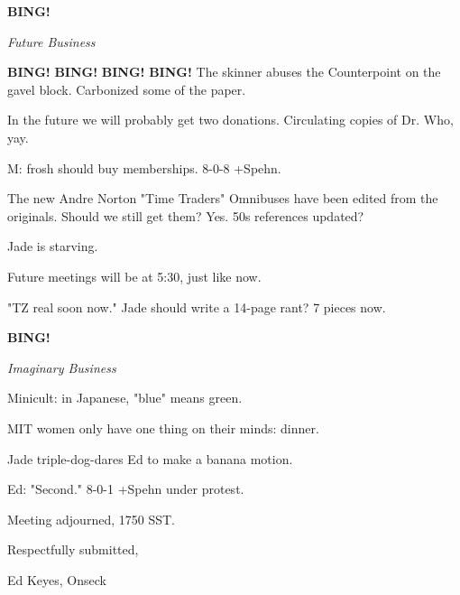 \documentclass[12pt]{article}
\newcommand{\bing}{{\bf BING!} }
\newcommand{\goto}[1]{\bing \vskip 12pt \centerline{{\em{#1}}}}
\begin{document}
\goto{Future Business}

\bing \bing \bing \bing The skinner abuses the Counterpoint on the gavel block. Carbonized some of the paper.

In the future we will probably get two donations. Circulating copies of Dr. Who, yay.

M: frosh should buy memberships. 8-0-8 +Spehn.

The new Andre Norton "Time Traders" Omnibuses have been edited from the originals. Should we still get them? Yes. 50s references updated?

Jade is starving.

Future meetings will be at 5:30, just like now.

"TZ real soon now." Jade should write a 14-page rant? 7 pieces now.

\goto{Imaginary Business}

Minicult: in Japanese, "blue" means green.

MIT women only have one thing on their minds: dinner.

Jade triple-dog-dares Ed to make a banana motion.

Ed: "Second." 8-0-1 +Spehn under protest.

\vspace{12pt}

\noindent
Meeting adjourned, 1750 SST.

\vspace{18pt}

\centerline{Respectfully submitted,}
\centerline{Ed Keyes, Onseck}
\end{document}
